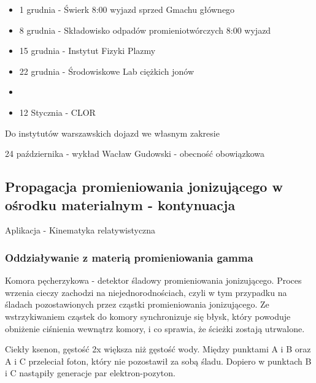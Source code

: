 \documentclass{article}
\begin{document}
\begin{itemize}
    \item 1 grudnia - Świerk 8:00 wyjazd sprzed Gmachu głównego
    \item 8 grudnia - Składowisko odpadów promieniotwórczych 8:00 wyjazd
    \item 15 grudnia - Instytut Fizyki Plazmy
    \item 22 grudnia - Środowiskowe Lab ciężkich jonów
    \item 
    \item 12 Stycznia - CLOR
\end{itemize}

Do instytutów warszawskich dojazd we własnym zakresie

24 października - wykład Wacław Gudowski - obecność obowiązkowa

\subsection{Propagacja promieniowania jonizującego w ośrodku materialnym - kontynuacja}

Aplikacja - Kinematyka relatywistyczna

\subsubsection{Oddziaływanie z materią promieniowania gamma}

Komora pęcherzykowa - detektor śladowy promieniowania jonizującego. Proces wrzenia cieczy zachodzi na niejednorodnościach, czyli w tym przypadku na śladach pozostawionych przez cząstki promieniowania jonizującego. Ze wstrzykiwaniem cząstek do komory synchronizuje się błysk, który powoduje obniżenie ciśnienia wewnątrz komory, i co sprawia, że ścieżki zostają utrwalone.

Ciekły ksenon, gęstość 2x większa niż gęstość wody. Między punktami A i B oraz A i C przeleciał foton, który nie pozostawił za sobą śladu. Dopiero w punktach B i C nastąpiły generacje par elektron-pozyton.
\end{document}
